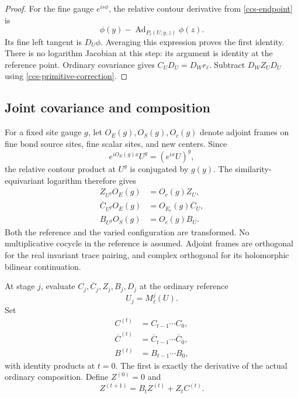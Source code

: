 \documentclass[11pt]{article}
\theoremstyle{remark}
\begin{document}
\begin{proof}
For the fine gauge \(e^{is\phi}\), the relative contour derivative
from \eqref{ccs-endpoint} is
\[
 \phi(y)-\operatorname{Ad}_{P_\ell(U;y,z)}\phi(z).
\]
Its fine left tangent is \(D_U\phi\). Averaging this expression
proves the first identity. There is no logarithm Jacobian at this
step: its argument is identity at the reference point.
Ordinary covariance gives \(C_UD_U=D_Wr_\ell\). Subtract
\(D_WZ_UD_U\) using \eqref{ccs-primitive-correction}.
\end{proof}

\subsection{Joint covariance and composition}
\label{ccs-composition-section}

For a fixed site gauge \(g\), let \(O_E(g),O_S(g),O_c(g)\)
denote adjoint frames on fine bond source sites, fine scalar sites,
and new centers. Since
\[
 e^{iO_E(g)x}U^g=(e^{ix}U)^g,
\]
the relative contour product at \(U^g\) is conjugated by \(g(y)\).
The similarity-equivariant logarithm therefore gives
\begin{equation}
 \begin{split}
 Z_{U^g}O_E(g)&=O_c(g)Z_U,\\
 \overline C_{U^g}O_E(g)&=O_{E_c}(g)\overline C_U,\\
 B_{U^g}O_S(g)&=O_c(g)B_U.
 \end{split}
 \label{ccs-primitive-covariance}
\end{equation}
Both the reference and the varied configuration are transformed.
No multiplicative cocycle in the reference is assumed.
Adjoint frames are orthogonal for the real invariant trace pairing,
and complex orthogonal for its holomorphic bilinear continuation.

At stage \(j\), evaluate \(C_j,\overline C_j,Z_j,B_j,D_j\)
at the ordinary reference
\[
                         U_j=M_\ell^j(U).
\]
Set
\begin{equation}
 \begin{split}
 C^{(t)}&=C_{t-1}\cdots C_0,\\
 \overline C^{(t)}&=\overline C_{t-1}\cdots\overline C_0,\\
 B^{(t)}&=B_{t-1}\cdots B_0,
 \end{split}
 \label{ccs-products}
\end{equation}
with identity products at \(t=0\).
The first is exactly the derivative of the actual ordinary
composition. Define \(Z^{(0)}=0\) and
\begin{equation}
        Z^{(t+1)}=B_tZ^{(t)}+Z_tC^{(t)}.
 \label{ccs-Z-recursion}
\end{equation}
\end{document}
